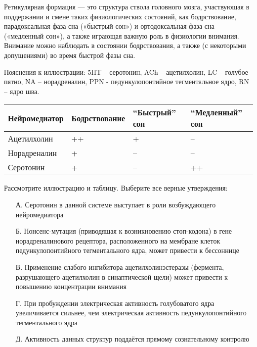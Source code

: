 
Ретикулярная формация — это структура ствола головного мозга, участвующая в поддержании и смене таких физиологических состояний, как бодрствование, парадоксальная фаза сна («быстрый сон») и ортодоксальная фаза сна («медленный сон»), а также играющая важную роль в физиологии внимания. Внимание можно наблюдать в состоянии бодрствования, а также (с некоторыми допущениями) во время быстрой фазы сна. 


Пояснения к иллюстрации: 5HT – серотонин, ACh – ацетилхолин, LC – голубое пятно, NA – норадреналин, PPN - педункулопонтийное тегментальное ядро, RN – ядро шва.

\begin{table}[H]
    \begin{center}
        \begin{tabular}{|p{2cm}|p{2cm}|p{2cm}|p{2cm}|}
            \hline
            Нейромедиатор & Бодрствование & “Быстрый” сон & “Медленный” сон \\
            \hline
            Ацетилхолин & ++ & + & -- \\
            \hline
            Норадреналин & + & -- & -- \\
            \hline
            Серотонин & + & -- & ++ \\
            \hline
        \end{tabular}
    \end{center}
\end{table}

Рассмотрите иллюстрацию и таблицу. Выберите все верные утверждения:
\begin{enumerate}
    \item[А.] Серотонин в данной системе выступает в роли возбуждающего нейромедиатора
    \item[Б.] Нонсенс-мутация (приводящая к возникновению стоп-кодона)  в гене норадреналинового рецептора, расположенного на мембране клеток педункулопонтийного тегментального ядра, может привести к бессоннице
    \item[В.] Применение слабого ингибитора ацетилхолинэстеразы (фермента, разрушающего ацетилхолин в синаптической щели) может привести к повышению концентрации внимания
    \item[Г.] При пробуждении электрическая активность голубоватого ядра увеличивается сильнее, чем электрическая активность педункулопонтийного тегментального ядра
    \item[Д.] Активность данных структур поддаётся прямому сознательному контролю
\end{enumerate} 

